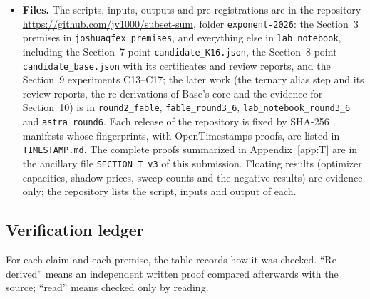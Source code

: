 \documentclass[11pt]{article}
\theoremstyle{plain}
\begin{document}
\begin{itemize}
\item \textbf{Files.} The scripts, inputs, outputs and pre-registrations are in the repository \url{https://github.com/jv1000/subset-sum}, folder \texttt{exponent-2026}: the Section~3 premises in \texttt{joshuaqfex\_premises}, and everything else in \texttt{lab\_notebook}, including the Section~7 point \texttt{candidate\_K16.json}, the Section~8 point \texttt{candidate\_base.json} with its certificates and review reports, and the Section~9 experiments C13--C17; the later work (the ternary alias step and its review reports, the re-derivations of Base's core and the evidence for Section~10) is in \texttt{round2\_fable}, \texttt{fable\_round3\_6}, \texttt{lab\_notebook\_round3\_6} and \texttt{astra\_round6}. Each release of the repository is fixed by SHA-256 manifests whose fingerprints, with OpenTimestamps proofs, are listed in \texttt{TIMESTAMP.md}. The complete proofs summarized in Appendix~\ref{app:T} are in the ancillary file \texttt{SECTION\_T\_v3} of this submission. Floating results (optimizer capacities, shadow prices, sweep counts and the negative results) are evidence only; the repository lists the script, inputs and output of each.
\end{itemize}

\subsection*{Verification ledger}
For each claim and each premise, the table records how it was checked. ``Re-derived'' means an independent written proof compared afterwards with the source; ``read'' means checked only by reading.
\end{document}
